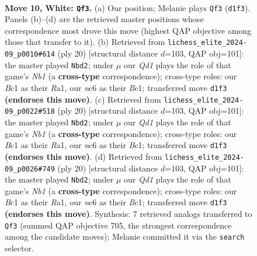 \documentclass[11pt]{article}
\begin{document}
\clearpage

\begin{figure}[p]\centering
\begin{subfigure}{0.46\textwidth}\centering
\resizebox{\linewidth}{!}{%
\newchessgame
\chessboard[
  setfen={r2q1rk1/2pbbppp/p1np1n2/1p2p1N1/P3P3/1B6/1PPP1PPP/RNBQR1K1 w - - 3 10},
  showmover=false,
  pgfstyle=straightmove, color=movearrow, markmove={d1-f3}
]}
\caption{}
\end{subfigure}\hfill
\begin{subfigure}{0.46\textwidth}\centering
\resizebox{\linewidth}{!}{%
\newchessgame
\chessboard[
  setfen={r2qr1k1/1bp1bppp/p1np1n2/1p2p3/3PP3/1BP2N1P/PP3PP1/RNBQR1K1 w - - 1 11},
  showmover=false,
  pgfstyle=straightmove, color=movearrow, markmove={b1-d2}
]}
\caption{}
\end{subfigure}
\\[4pt]
\begin{subfigure}{0.46\textwidth}\centering
\resizebox{\linewidth}{!}{%
\newchessgame
\chessboard[
  setfen={r2qr1k1/1bp1bppp/p1np1n2/1p2p3/3PP3/1BP2N1P/PP3PP1/RNBQR1K1 w - - 1 11},
  showmover=false,
  pgfstyle=straightmove, color=movearrow, markmove={b1-d2}
]}
\caption{}
\end{subfigure}\hfill
\begin{subfigure}{0.46\textwidth}\centering
\resizebox{\linewidth}{!}{%
\newchessgame
\chessboard[
  setfen={r2qr1k1/1bp1bppp/p1np1n2/1p2p3/3PP3/1BP2N1P/PP3PP1/RNBQR1K1 w - - 1 11},
  showmover=false,
  pgfstyle=straightmove, color=movearrow, markmove={b1-d2}
]}
\caption{}
\end{subfigure}
\caption{\textbf{Move 10, White: \texttt{Qf3}.} (a) Our position; Melanie plays \texttt{Qf3} (\texttt{d1f3}). Panels (b)--(d) are the retrieved master positions whose correspondence most drove this move (highest QAP objective among those that transfer to it). (b) Retrieved from \texttt{lichess\_elite\_2024-09\_p0010\#614} (ply 20) [structural distance $d$=103, QAP obj=101]: the master played \texttt{Nbd2}; under $\mu$ our \emph{Qd1} plays the role of that game's \emph{Nb1} (a \textbf{cross-type} correspondence); cross-type roles: our \emph{B}c1 as their \emph{R}a1, our \emph{n}c6 as their \emph{B}c1; transferred move \texttt{d1f3} \textbf{(endorses this move)}. (c) Retrieved from \texttt{lichess\_elite\_2024-09\_p0022\#518} (ply 20) [structural distance $d$=103, QAP obj=101]: the master played \texttt{Nbd2}; under $\mu$ our \emph{Qd1} plays the role of that game's \emph{Nb1} (a \textbf{cross-type} correspondence); cross-type roles: our \emph{B}c1 as their \emph{R}a1, our \emph{n}c6 as their \emph{B}c1; transferred move \texttt{d1f3} \textbf{(endorses this move)}. (d) Retrieved from \texttt{lichess\_elite\_2024-09\_p0026\#749} (ply 20) [structural distance $d$=103, QAP obj=101]: the master played \texttt{Nbd2}; under $\mu$ our \emph{Qd1} plays the role of that game's \emph{Nb1} (a \textbf{cross-type} correspondence); cross-type roles: our \emph{B}c1 as their \emph{R}a1, our \emph{n}c6 as their \emph{B}c1; transferred move \texttt{d1f3} \textbf{(endorses this move)}. Synthesis: 7 retrieved analogs transferred to \texttt{Qf3} (summed QAP objective 705, the strongest correspondence among the candidate moves); Melanie committed it via the \texttt{search} selector.}

\end{figure}
\end{document}
